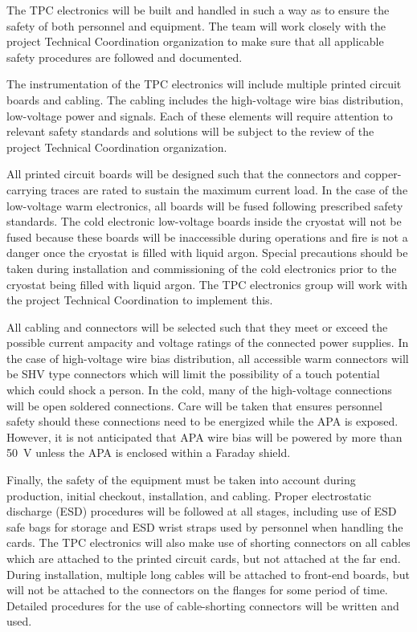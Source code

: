 The TPC electronics will be built and handled in such a way as to ensure the safety of both personnel and equipment.  The team will work closely with the project Technical Coordination organization to make sure that all applicable safety procedures are followed and documented.

The instrumentation of the TPC electronics will include multiple printed circuit boards and cabling.  The cabling includes the high-voltage wire bias distribution, low-voltage power and signals.  Each of these elements will require attention to relevant safety standards and solutions will be subject to the review of the project Technical Coordination organization.

All printed circuit boards will be designed such that the connectors and copper-carrying traces are rated to sustain the maximum current load.  In the case of the low-voltage warm electronics, all boards will be fused following prescribed safety standards.  The cold electronic low-voltage boards inside the cryostat will not be fused because these boards will be inaccessible during operations and fire is not a danger once the cryostat is filled with liquid argon.  Special precautions should be taken during installation and commissioning of the cold electronics prior to the cryostat being filled with liquid argon.  The TPC electronics group will work with the project Technical Coordination to implement this.

All cabling and connectors will be selected such that they meet or exceed the possible current ampacity and voltage ratings of the connected power supplies.  In the case of high-voltage wire bias distribution, all accessible warm connectors will be SHV type connectors which will limit the possibility of a touch potential which could shock a person.  In the cold, many of the high-voltage connections will be open soldered connections. Care will be taken that ensures personnel safety should these connections need to be energized while the APA is exposed.  However, it is not anticipated that APA wire bias will be powered by more than 50~V unless the APA is enclosed within a Faraday shield.

Finally, the safety of the equipment must be taken into account during production, initial checkout, installation, and cabling.  Proper electrostatic discharge (ESD) procedures will be followed at all stages, including use of ESD safe bags for storage and ESD wrist straps used by personnel when handling the cards.  The TPC electronics will also make use of shorting connectors on all cables which are attached to the printed circuit cards, but not attached at the far end.  During installation, multiple long cables will be attached to front-end boards, but will not be attached to the connectors on the flanges for some period of time.  Detailed procedures for the use of cable-shorting connectors will be written and used.

